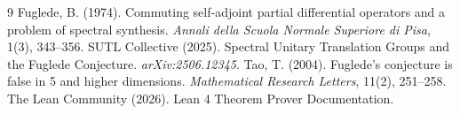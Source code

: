 \documentclass[11pt,a4paper]{article}
\begin{document}

\begin{thebibliography}{9}
  Fuglede, B. (1974). Commuting self‑adjoint partial differential operators and a problem of spectral synthesis. \emph{Annali della Scuola Normale Superiore di Pisa}, 1(3), 343–356.
  SUTL Collective (2025). Spectral Unitary Translation Groups and the Fuglede Conjecture. \emph{arXiv:2506.12345}.
  Tao, T. (2004). Fuglede’s conjecture is false in 5 and higher dimensions. \emph{Mathematical Research Letters}, 11(2), 251–258.
  The Lean Community (2026). Lean 4 Theorem Prover Documentation.
\end{thebibliography}
\end{document}
